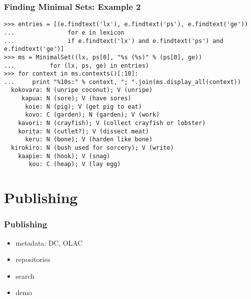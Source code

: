 \documentclass{beamer}             %
\begin{document}
\begin{frame}[fragile]
\frametitle{Finding Minimal Sets: Example 2}
\scriptsize

\begin{verbatim}
>>> entries = [(e.findtext('lx'), e.findtext('ps'), e.findtext('ge'))
...               for e in lexicon
...               if e.findtext('lx') and e.findtext('ps') and e.findtext('ge')]
>>> ms = MinimalSet((lx, ps[0], "%s (%s)" % (ps[0], ge))
...          for (lx, ps, ge) in entries)
>>> for context in ms.contexts()[:10]:
...     print "%10s:" % context, "; ".join(ms.display_all(context))
  kokovara: N (unripe coconut); V (unripe)
     kapua: N (sore); V (have sores)
      koie: N (pig); V (get pig to eat)
      kovo: C (garden); N (garden); V (work)
    kavori: N (crayfish); V (collect crayfish or lobster)
    korita: N (cutlet?); V (dissect meat)
      keru: N (bone); V (harden like bone)
  kirokiro: N (bush used for sorcery); V (write)
    kaapie: N (hook); V (snag)
       kou: C (heap); V (lay egg)
\end{verbatim}
\end{frame}


\section{Publishing}

\begin{frame}
\frametitle{Publishing}

\begin{itemize}
\item metadata: DC, OLAC
\item repositories
\item search
\item demo
\end{itemize}

\end{frame}
\end{document}
